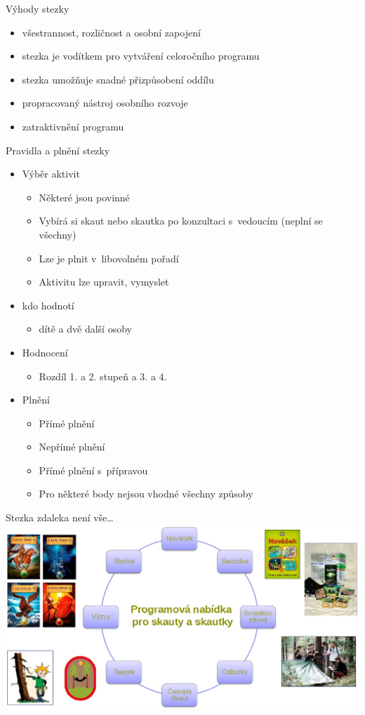 \documentclass[compress,utf8,xcolor=dvipsnames]{beamer}
\begin{document}
\begin{frame}{Výhody stezky}
\begin{itemize}
\item všestrannost, rozličnost a osobní zapojení
\item stezka je vodítkem pro vytváření celoročního programu
\item stezka umožňuje snadné přizpůsobení oddílu
\item propracovaný nástroj osobního rozvoje
\item zatraktivnění programu
\end{itemize}
\end{frame}

\begin{frame}{Pravidla a plnění stezky}
\begin{itemize}
\item Výběr aktivit
 \begin{itemize}
 \item Některé jsou povinné
 \item Vybírá si skaut nebo skautka po konzultaci s~vedoucím (neplní se všechny)
 \item Lze je plnit v~libovolném pořadí
 \item Aktivitu lze upravit, vymyslet
 \end{itemize}
\item kdo hodnotí
 \begin{itemize}
 \item dítě a dvě další osoby
 \end{itemize}
\item Hodnocení
 \begin{itemize}
 \item Rozdíl 1. a 2. stupeň a 3. a 4.
 \end{itemize}
\item Plnění
 \begin{itemize}
 \item Přímé plnění
 \item Nepřímé plnění
 \item Přímé plnění s~přípravou
 \item Pro některé body nejsou vhodné všechny způsoby
 \end{itemize}
\end{itemize}
\end{frame}

\begin{frame}{Stezka zdaleka není vše\ldots}
\includegraphics[width=\textwidth]{komplet.png}
\end{frame}
\end{document}
